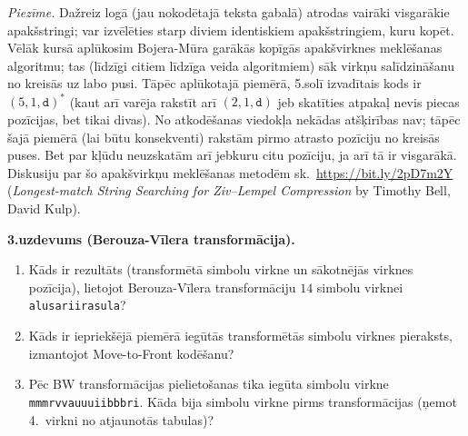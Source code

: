 \documentclass[a4paper,12pt]{article}
\begin{document}
{{\em Piezīme.} Dažreiz logā (jau nokodētajā teksta gabalā) atrodas vairāki visgarākie
apakšstringi; var izvēlēties starp diviem identiskiem apakšstringiem, kuru kopēt. 
Vēlāk kursā aplūkosim Bojera-Mūra garākās kopīgās apakšvirknes meklēšanas algoritmu; tas (līdzīgi 
citiem līdzīga veida algoritmiem) sāk virkņu salīdzināšanu no kreisās uz labo pusi. 
Tāpēc aplūkotajā piemērā, 5.solī izvadītais kods ir $(5,1,\mathtt{d})^{\ast}$
(kaut arī varēja rakstīt arī $(2,1,\mathtt{d})$ jeb skatīties atpakaļ nevis piecas pozīcijas, bet tikai divas). 
No atkodēšanas viedokļa nekādas atšķirības nav; tāpēc šajā piemērā (lai būtu konsekventi) rakstām 
pirmo atrasto pozīciju no kreisās puses. Bet par kļūdu neuzskatām arī jebkuru citu pozīciju, ja 
arī tā ir visgarākā. Diskusiju par šo apakšvirkņu meklēšanas metodēm sk.\ 
\url{https://bit.ly/2pD7m2Y} ({\em Longest-match String Searching for Ziv–Lempel Compression} by 
Timothy Bell, David Kulp). 


}



{\bf 3.uzdevums (Berouza-Vīlera transformācija).}

\begin{enumerate}
\item 
Kāds ir rezultāts (transformētā simbolu virkne un sākotnējās virknes pozīcija), 
lietojot Berouza-Vīlera transformāciju 
$14$ simbolu virknei {\tt alusariirasula}?
\item Kāds ir iepriekšējā piemērā iegūtās transformētās simbolu virknes pieraksts,
izmantojot Move-to-Front kodēšanu?
\item Pēc BW transformācijas pielietošanas tika iegūta simbolu virkne 
{\tt mmmrvvauuuiibbbri}. Kāda bija simbolu virkne pirms 
transformācijas (ņemot 4.\ virkni
no atjaunotās tabulas)?
\end{enumerate}
\end{document}
